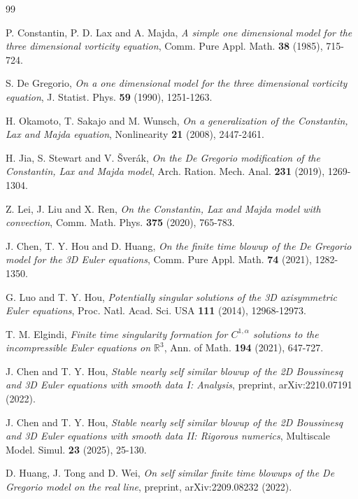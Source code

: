\documentclass[11pt]{article}
\theoremstyle{definition}
\newcommand{\Real}{\mathbb{R}}
\begin{document}
\begin{thebibliography}{99}

 P. Constantin, P. D. Lax and A. Majda,
  \emph{A simple one dimensional model for the three dimensional vorticity
  equation}, Comm. Pure Appl. Math. \textbf{38} (1985), 715-724.

 S. De Gregorio,
  \emph{On a one dimensional model for the three dimensional vorticity
  equation}, J. Statist. Phys. \textbf{59} (1990), 1251-1263.

 H. Okamoto, T. Sakajo and M. Wunsch,
  \emph{On a generalization of the Constantin, Lax and Majda equation},
  Nonlinearity \textbf{21} (2008), 2447-2461.

 H. Jia, S. Stewart and V. \v{S}ver\'{a}k,
  \emph{On the De Gregorio modification of the Constantin, Lax and Majda
  model}, Arch. Ration. Mech. Anal. \textbf{231} (2019), 1269-1304.

 Z. Lei, J. Liu and X. Ren,
  \emph{On the Constantin, Lax and Majda model with convection},
  Comm. Math. Phys. \textbf{375} (2020), 765-783.

 J. Chen, T. Y. Hou and D. Huang,
  \emph{On the finite time blowup of the De Gregorio model for the 3D Euler
  equations}, Comm. Pure Appl. Math. \textbf{74} (2021), 1282-1350.

 G. Luo and T. Y. Hou,
  \emph{Potentially singular solutions of the 3D axisymmetric Euler
  equations}, Proc. Natl. Acad. Sci. USA \textbf{111} (2014), 12968-12973.

 T. M. Elgindi,
  \emph{Finite time singularity formation for $C^{1,\alpha}$ solutions to the
  incompressible Euler equations on $\Real^3$}, Ann. of Math. \textbf{194}
  (2021), 647-727.

 J. Chen and T. Y. Hou,
  \emph{Stable nearly self similar blowup of the 2D Boussinesq and 3D Euler
  equations with smooth data I: Analysis}, preprint, arXiv:2210.07191 (2022).

 J. Chen and T. Y. Hou,
  \emph{Stable nearly self similar blowup of the 2D Boussinesq and 3D Euler
  equations with smooth data II: Rigorous numerics},
  Multiscale Model. Simul. \textbf{23} (2025), 25-130.

 D. Huang, J. Tong and D. Wei,
  \emph{On self similar finite time blowups of the De Gregorio model on the
  real line}, preprint, arXiv:2209.08232 (2022).


\end{thebibliography}
\end{document}
